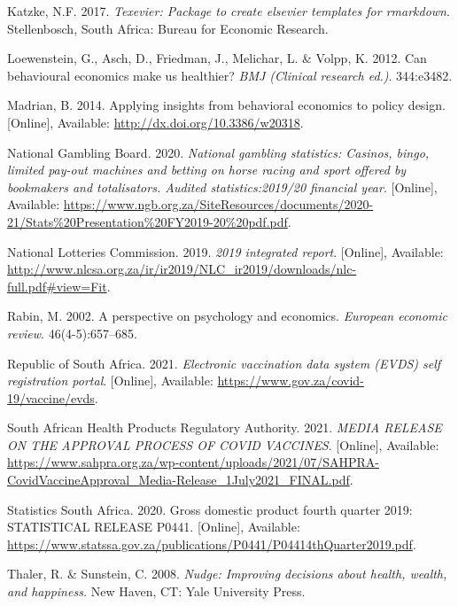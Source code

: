 \documentclass[11pt,preprint, authoryear]{elsarticle}
\numberwithin{equation}{section}
\numberwithin{figure}{section}
\numberwithin{table}{section}
\newlength{\cslhangindent}
\newenvironment{CSLReferences}%
  {\setlength{\parindent}{0pt}%
  \everypar{\setlength{\hangindent}{\cslhangindent}}\ignorespaces}%
  {\par}
\begin{document}
\begin{CSLReferences}{1}{0}
\leavevmode\hypertarget{ref-Texevier}{}%
Katzke, N.F. 2017. \emph{{Texevier}: {P}ackage to create elsevier
templates for rmarkdown}. Stellenbosch, South Africa: Bureau for
Economic Research.

\leavevmode\hypertarget{ref-health}{}%
Loewenstein, G., Asch, D., Friedman, J., Melichar, L. \& Volpp, K. 2012.
Can behavioural economics make us healthier? \emph{BMJ (Clinical
research ed.)}. 344:e3482.

\leavevmode\hypertarget{ref-flu}{}%
Madrian, B. 2014. Applying insights from behavioral economics to policy
design. {[}Online{]}, Available: \url{http://dx.doi.org/10.3386/w20318}.

\leavevmode\hypertarget{ref-gamble}{}%
National Gambling Board. 2020. \emph{National gambling statistics:
Casinos, bingo, limited pay-out machines and betting on horse racing and
sport offered by bookmakers and totalisators. Audited statistics:2019/20
financial year}. {[}Online{]}, Available:
\url{https://www.ngb.org.za/SiteResources/documents/2020-21/Stats\%20Presentation\%20FY2019-20\%20pdf.pdf}.

\leavevmode\hypertarget{ref-lotto}{}%
National Lotteries Commission. 2019. \emph{2019 integrated report}.
{[}Online{]}, Available:
\url{http://www.nlcsa.org.za/ir/ir2019/NLC_ir2019/downloads/nlc-full.pdf\#view=Fit}.

\leavevmode\hypertarget{ref-rabin}{}%
Rabin, M. 2002. A perspective on psychology and economics.
\emph{European economic review}. 46(4-5):657--685.

\leavevmode\hypertarget{ref-evds}{}%
Republic of South Africa. 2021. \emph{Electronic vaccination data system
(EVDS) self registration portal}. {[}Online{]}, Available:
\url{https://www.gov.za/covid-19/vaccine/evds}.

\leavevmode\hypertarget{ref-sah}{}%
South African Health Products Regulatory Authority. 2021. \emph{MEDIA
RELEASE ON THE APPROVAL PROCESS OF COVID VACCINES}. {[}Online{]},
Available:
\url{https://www.sahpra.org.za/wp-content/uploads/2021/07/SAHPRA-CovidVaccineApproval_Media-Release_1July2021_FINAL.pdf}.

\leavevmode\hypertarget{ref-statsa}{}%
Statistics South Africa. 2020. Gross domestic product fourth quarter
2019: STATISTICAL RELEASE P0441. {[}Online{]}, Available:
\url{https://www.statssa.gov.za/publications/P0441/P04414thQuarter2019.pdf}.

\leavevmode\hypertarget{ref-nudge}{}%
Thaler, R. \& Sunstein, C. 2008. \emph{Nudge: Improving decisions about
health, wealth, and happiness.} New Haven, CT: Yale University Press.


\end{CSLReferences}
\end{document}
